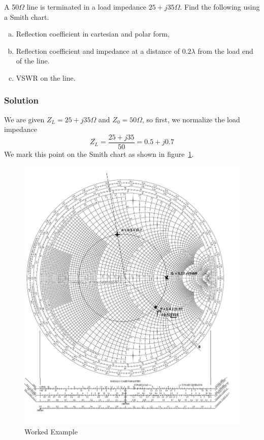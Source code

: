 \begin{exmp}
A 50$\Omega$ line is terminated in a load impedance $25+j35\Omega$. Find the following using a Smith chart.
\begin{enumerate}[(a)]
\item Reflection coefficient in cartesian and polar form,
\item Reflection coefficient and impedance at a distance of $0.2\lambda$ from the load end of the line.
\item VSWR on the line.
\end{enumerate}

\subsubsection*{Solution}
We are given $Z_{L}=25+j35\varOmega$ and $Z_{0}=50\varOmega$, so first, we normalize the load impedance
\begin{dmath*}
\bar{Z_{L}}=\frac{25+j35}{50}=0.5+j0.7
\end{dmath*}
We mark this point on the Smith chart as shown in figure~\ref{fig:workedexample2}.
\begin{figure}[h]
\centering
\includegraphics[width=1\linewidth]{"./graphics/Smith chart 1"}
\caption{Worked Example}
\label{fig:workedexample2}
\end{figure}


\end{exmp}
